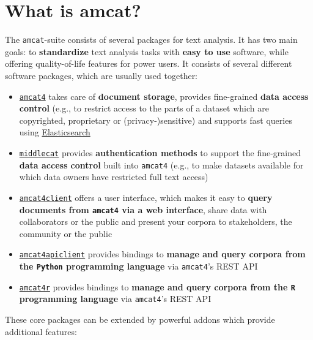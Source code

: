 \documentclass[
  letterpaper,
  DIV=11,
  numbers=noendperiod]{scrreprt}
\providecommand{\tightlist}{%
  \setlength{\itemsep}{0pt}\setlength{\parskip}{0pt}}\usepackage{longtable,booktabs,array}
\begin{document}
\section{What is amcat?}\label{what-is-amcat}

The \texttt{amcat}-suite consists of several packages for text analysis.
It has two main goals: to \textbf{standardize} text analysis tasks with
\textbf{easy to use} software, while offering quality-of-life features
for power users. It consists of several different software packages,
which are usually used together:

\begin{itemize}
\tightlist
\item
  \href{https://github.com/ccs-amsterdam/amcat4}{\texttt{amcat4}} takes
  care of \textbf{document storage}, provides fine-grained \textbf{data
  access control} (e.g., to restrict access to the parts of a dataset
  which are copyrighted, proprietary or (privacy-)sensitive) and
  supports fast queries using
  \href{https://www.elastic.co/what-is/elasticsearch}{Elasticsearch}
\item
  \href{https://github.com/ccs-amsterdam/middlecat}{\texttt{middlecat}}
  provides \textbf{authentication methods} to support the fine-grained
  \textbf{data access control} built into \texttt{amcat4} (e.g., to make
  datasets available for which data owners have restricted full text
  access)
\item
  \href{https://github.com/ccs-amsterdam/amcat4client}{\texttt{amcat4client}}
  offers a user interface, which makes it easy to \textbf{query
  documents from \texttt{amcat4} via a web interface}, share data with
  collaborators or the public and present your corpora to stakeholders,
  the community or the public
\item
  \href{https://github.com/ccs-amsterdam/amcat4apiclient}{\texttt{amcat4apiclient}}
  provides bindings to \textbf{manage and query corpora from the
  \texttt{Python} programming language} via \texttt{amcat4}'s REST API
\item
  \href{https://github.com/ccs-amsterdam/amcat4r}{\texttt{amcat4r}}
  provides bindings to \textbf{manage and query corpora from the
  \texttt{R} programming language} via \texttt{amcat4}'s REST API
\end{itemize}

These core packages can be extended by powerful addons which provide
additional features:
\end{document}
